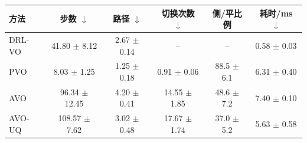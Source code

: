 \begin{tabular}{lccccc}
\toprule
方法 & 步数 $\downarrow$ & 路径 $\downarrow$ & 切换次数 $\downarrow$ & 侧/平比例 & 耗时/ms $\downarrow$ \\
\midrule
DRL-VO & 41.80 $\pm$ 8.12 & 2.67 $\pm$ 0.14 & -- & -- & 0.58 $\pm$ 0.03 \\
PVO & 8.03 $\pm$ 1.25 & 1.25 $\pm$ 0.18 & 0.91 $\pm$ 0.06 & 88.5 $\pm$ 6.1 & 6.31 $\pm$ 0.40 \\
AVO & 96.34 $\pm$ 12.45 & 4.20 $\pm$ 0.41 & 14.55 $\pm$ 1.85 & 48.6 $\pm$ 7.2 & 7.40 $\pm$ 0.10 \\
AVO-UQ & 108.57 $\pm$ 7.62 & 3.02 $\pm$ 0.48 & 17.67 $\pm$ 1.74 & 37.0 $\pm$ 5.2 & 5.63 $\pm$ 0.58 \\
\bottomrule
\end{tabular}
